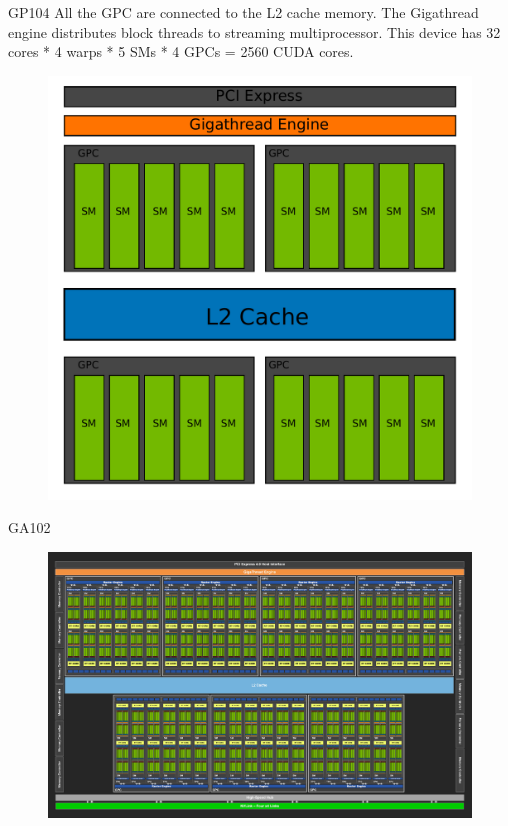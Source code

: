 \documentclass{beamer}
\begin{document}
\begin{frame}{GP104}
	All the GPC are connected to the L2 cache memory. The Gigathread engine distributes block threads to streaming multiprocessor. This device has 32 cores * 4 warps * 5 SMs * 4 GPCs = 2560 CUDA cores.
	\begin{figure}
		\includegraphics[scale=0.3]{figures/gp104.pdf}
	\end{figure}
\end{frame}

\begin{frame}{GA102}
	\begin{figure}
		\includegraphics[scale=0.25]{figures/GA102.png}
	\end{figure}
\end{frame}
\end{document}
